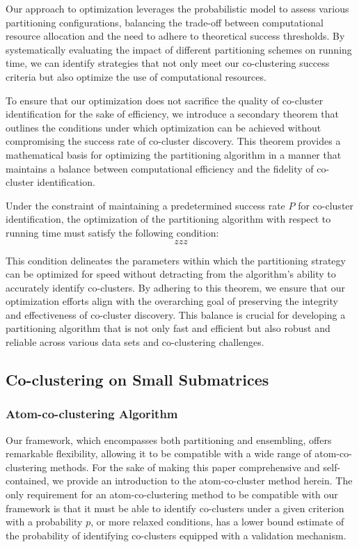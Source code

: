 Our approach to optimization leverages the probabilistic model to assess various partitioning configurations, balancing the trade-off between computational resource allocation and the need to adhere to theoretical success thresholds. By systematically evaluating the impact of different partitioning schemes on running time, we can identify strategies that not only meet our co-clustering success criteria but also optimize the use of computational resources.

To ensure that our optimization does not sacrifice the quality of co-cluster identification for the sake of efficiency, we introduce a secondary theorem that outlines the conditions under which optimization can be achieved without compromising the success rate of co-cluster discovery. This theorem provides a mathematical basis for optimizing the partitioning algorithm in a manner that maintains a balance between computational efficiency and the fidelity of co-cluster identification.

\begin{theorem}
\label{thm:optimization_theorem}
Under the constraint of maintaining a predetermined success rate $P$ for co-cluster identification, the optimization of the partitioning algorithm with respect to running time must satisfy the following condition:
\begin{equation}
\label{eq:optimization_condition}
zzz
\end{equation}
\end{theorem}

This condition delineates the parameters within which the partitioning strategy can be optimized for speed without detracting from the algorithm's ability to accurately identify co-clusters. By adhering to this theorem, we ensure that our optimization efforts align with the overarching goal of preserving the integrity and effectiveness of co-cluster discovery. This balance is crucial for developing a partitioning algorithm that is not only fast and efficient but also robust and reliable across various data sets and co-clustering challenges.

\subsection{Co-clustering on Small Submatrices}

\subsubsection{Atom-co-clustering Algorithm}
Our framework, which encompasses both partitioning and ensembling, offers remarkable flexibility, allowing it to be compatible with a wide range of atom-co-clustering methods. For the sake of making this paper comprehensive and self-contained, we provide an introduction to the atom-co-cluster method herein. The only requirement for an atom-co-clustering method to be compatible with our framework is that it must be able to identify co-clusters under a given criterion with a probability $p$, or more relaxed conditions, has a lower bound estimate of the probability of identifying co-clusters equipped with a validation mechanism.

